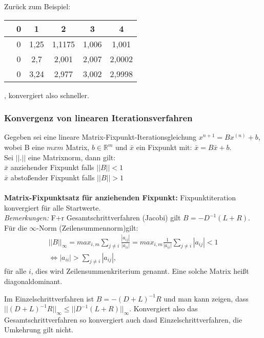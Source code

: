 \documentclass{scrartcl}
\begin{document}
Zurück zum Beispiel:
\begin{tabular}{c|ccccc} 
 & 0 & 1 & 2 & 3 & 4 \\ 
\hline 
 & 0 & 1,25 & 1,1175 & 1,006 & 1,001 \\ 
 
 & 0 & 2,7 & 2,001 & 2,007 & 2,0002 \\ 

 & 0 & 3,24 & 2,977 & 3,002 & 2,9998 \\ 

\end{tabular},
konvergiert also schneller.\\
\subsubsection*{Konvergenz von linearen Iterationsverfahren} 
Gegeben sei eine lineare Matrix-Fixpunkt-Iterationsgleichung $x^{n+1}=B x^{(n)}+b$, wobei B eine $m x m$ Matrix, $b \in \mathbb{R}^m$ und $\bar{x}$ ein Fixpunkt mit: $\bar{x}= B \bar{x}+ b$.\\
Sei $|| . ||$ eine Matrixnorm, dann gilt: \\
$\bar{x}$ anziehender Fixpunkt falls $||B|| < 1$\\
$\bar{x}$ abstoßender Fixpunkt falls $||B|| > 1$\\
\\
\textbf{Matrix-Fixpunktsatz für anziehenden Fixpunkt:} Fixpunktiteration konvergiert für alle Startwerte.\\
\textit{Bemerkungen:} F+r Gesamtschrittverfahren (Jacobi) gilt \textit{$B=-D^{-1}(L+R)$}. Für die $\infty$-Norm (Zeilensummennorm)gilt:
\begin{align*}
||B||_{\infty}=max_{i,m} \sum_{j \neq i} \frac{|a_{ij}|}{|a_{ii}|}=max_{i,m} \frac{1}{|a_{ii}|} \sum_{j \neq i} |a_{ij}|<1\\
\Leftrightarrow |a_{ii}|>\sum_{j \neq i} |a_{ij}|,
\end{align*}
für alle $i$, dies wird Zeilensummenkriterium genannt.
Eine solche Matrix heißt diagonaldominant.

Im Einzelschrittverfahren ist $B=-(D+L)^{-1} R$ und man kann zeigen, dass $||(D+L)^{-1}R||_{\infty} \leq ||D^{-1}(L+R)||_{\infty}$.
Konvergiert also das Gesamtschrittverfahren so konvergiert auch dasd Einzelschrittverfahren, die Umkehrung gilt nicht.
\end{document}
